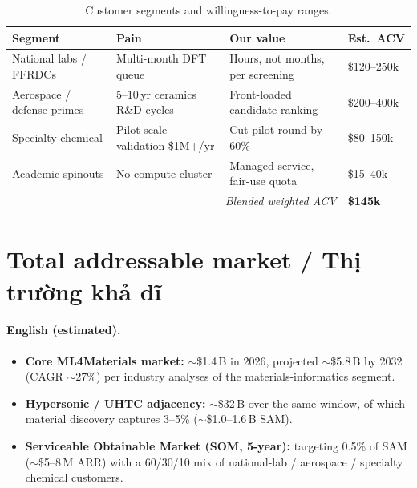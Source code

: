 \documentclass[11pt,a4paper]{report}
\begin{document}
\begin{table}[h]
\centering
\caption{Customer segments and willingness-to-pay ranges.}
\label{tab:segments}
\begin{tabular}{p{4.0cm}p{4.2cm}p{3.5cm}p{2.5cm}}
\toprule
\textbf{Segment} & \textbf{Pain} & \textbf{Our value} & \textbf{Est.\ ACV} \\
\midrule
National labs / FFRDCs & Multi-month DFT queue & Hours, not months, per screening & \$120--250k \\
Aerospace / defense primes & 5--10\,yr ceramics R\&D cycles & Front-loaded candidate ranking & \$200--400k \\
Specialty chemical & Pilot-scale validation \$1M+/yr & Cut pilot round by 60\% & \$80--150k \\
Academic spinouts & No compute cluster & Managed service, fair-use quota & \$15--40k \\
\midrule
\multicolumn{3}{r}{\textit{Blended weighted ACV}} & \textbf{\$145k} \\
\bottomrule
\end{tabular}
\end{table}

\section{Total addressable market / Thị trường khả dĩ}

\paragraph{English (estimated).}
\begin{itemize}[leftmargin=*,itemsep=2pt]
\item \textbf{Core ML4Materials market:} $\sim$\$1.4\,B in 2026, projected $\sim$\$5.8\,B by
      2032 (CAGR $\sim$27\%) per industry analyses of the materials-informatics segment.
\item \textbf{Hypersonic / UHTC adjacency:} $\sim$\$32\,B over the same window, of which
      material discovery captures 3--5\% ($\sim$\$1.0--1.6\,B SAM).
\item \textbf{Serviceable Obtainable Market (SOM, 5-year):} targeting 0.5\% of SAM
      ($\sim$\$5--8\,M ARR) with a 60/30/10 mix of national-lab / aerospace / specialty
      chemical customers.
\end{itemize}
\end{document}
